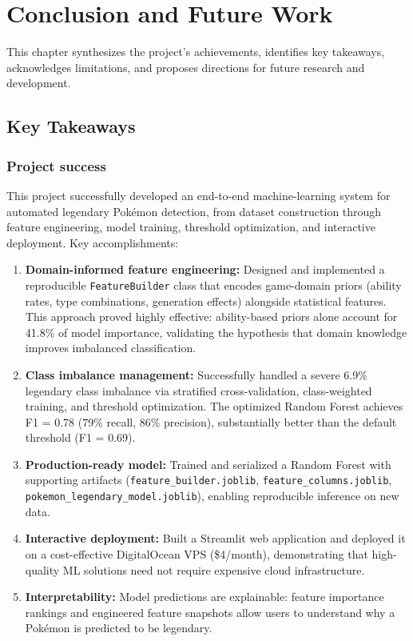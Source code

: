 \chapter{Conclusion and Future Work}
\label{chap:conclusion}

This chapter synthesizes the project's achievements, identifies key takeaways, acknowledges limitations, and proposes directions for future research and development.

\section{Key Takeaways}
\label{sec:takeaways}

\subsection{Project success}

This project successfully developed an end-to-end machine-learning system for automated legendary Pokémon detection, from dataset construction through feature engineering, model training, threshold optimization, and interactive deployment. Key accomplishments:

\begin{enumerate}
  \item \textbf{Domain-informed feature engineering:} Designed and implemented a reproducible \texttt{FeatureBuilder} class that encodes game-domain priors (ability rates, type combinations, generation effects) alongside statistical features. This approach proved highly effective: ability-based priors alone account for 41.8\% of model importance, validating the hypothesis that domain knowledge improves imbalanced classification.
  
  \item \textbf{Class imbalance management:} Successfully handled a severe 6.9\% legendary class imbalance via stratified cross-validation, class-weighted training, and threshold optimization. The optimized Random Forest achieves F1 = 0.78 (79\% recall, 86\% precision), substantially better than the default threshold (F1 = 0.69).
  
  \item \textbf{Production-ready model:} Trained and serialized a Random Forest with supporting artifacts (\texttt{feature\_builder.joblib}, \texttt{feature\_columns.joblib}, \texttt{pokemon\_legendary\_model.joblib}), enabling reproducible inference on new data.
  
  \item \textbf{Interactive deployment:} Built a Streamlit web application and deployed it on a cost-effective DigitalOcean VPS (\$4/month), demonstrating that high-quality ML solutions need not require expensive cloud infrastructure.
  
  \item \textbf{Interpretability:} Model predictions are explainable: feature importance rankings and engineered feature snapshots allow users to understand why a Pokémon is predicted to be legendary.
\end{enumerate}

